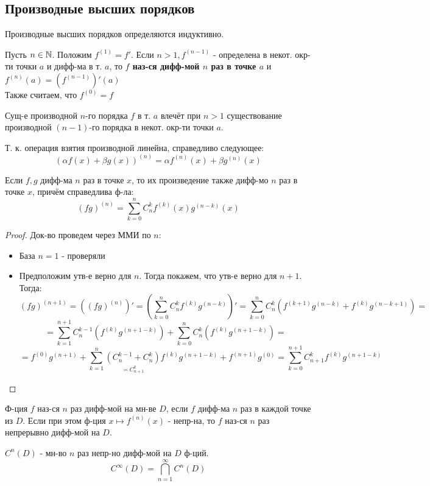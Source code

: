 \subsection{Производные высших порядков}
Производные высших порядков определяются индуктивно.
\begin{definition}
Пусть $n \in \mathbb{N}$. Положим $f^{(1)} = f'$. Если $n > 1, f^{(n - 1)}$ - определена в некот. окр-ти точки $a$ и дифф-ма в т. $a$, то \textbf{$f$ наз-ся дифф-мой $n$ раз в точке $a$} и $f^{(n)}(a) = (f^{(n - 1)})'(a)$ \\

Также считаем, что $f^{(0)} = f$ \\

\end{definition}
\begin{note}
Сущ-е производной $n$-го порядка $f$ в т. $a$ влечёт при $n > 1$ существование производной $(n - 1)$-го порядка в некот. окр-ти точки $a$.
\end{note}
\begin{note}
Т. к. операция взятия производной линейна, справедливо следующее:
\[
  (\alpha f(x) + \beta g(x) )^{(n)} = \alpha f^{(n)}(x) + \beta g^{(n)} (x)
\]
\end{note}
\begin{theorem}[Ф-ла Лейбница]
Если $f, g$ дифф-ма $n$ раз в точке $x$, то их произведение также дифф-мо $n$ раз в точке $x$, причём справедлива ф-ла:
\[
  (fg)^{(n)} = \sum_{k = 0}^{n} C_{n}^{k} f^{(k)}(x) g^{(n - k)}(x)
\]
\end{theorem}
\begin{proof}
Док-во проведем через ММИ по $n$:
\begin{itemize}
  \item База $n = 1$ - проверяли
  \item Предположим утв-е верно для $n$. Тогда покажем, что утв-е верно для $n + 1$. Тогда:
    \[
      (fg)^{(n + 1)} = ((fg)^{(n)})' = \left(\sum_{k = 0}^{n} C_{n}^{k} f^{(k)} g^{(n - k)}\right)' = \sum_{k = 0}^{n} C_{n}^{k} (f^{(k + 1)}g^{(n - k)} + f^{(k)}g^{(n - k + 1)}) =
    \]
    \[
    = \sum_{k = 1}^{n + 1} C_{n}^{k - 1} \left(f^{(k)}g^{(n + 1 - k)}\right) + \sum_{k = 0}^{n} C_{n}^{k} (f^{(k)}g^{(n + 1 - k)}) = 
    \]
    \[
    = f^{(0)}g^{(n + 1)} + \sum_{k = 1}^{n} \underset{= C_{n + 1}^{k}}{\left(C_{n}^{k - 1} + C_{n}^{k}\right)} f^{(k)}g^{(n + 1 - k)} + f^{(n + 1)} g^{(0)} = \sum_{k = 0}^{n + 1} C_{n + 1}^{k} f^{(k)} g^{(n + 1 - k)}
    \]
\end{itemize}
\end{proof}
\begin{definition}
Ф-ция $f$ наз-ся $n$ раз дифф-мой на мн-ве $D$, если $f$ дифф-ма $n$ раз в каждой точке из $D$. Если при этом ф-ция $x \mapsto f^{(n)}(x)$ - непр-на, то $f$ наз-ся $n$ раз непрерывно дифф-мой на $D$. 
\end{definition}
\begin{symb}
$C^{n}(D)$ - мн-во $n$ раз непр-но дифф-мой на $D$ ф-ций. \\
\[
C^{\infty}(D) = \bigcap_{n = 1}^{\infty} C^{n}(D)
\]
\end{symb}
